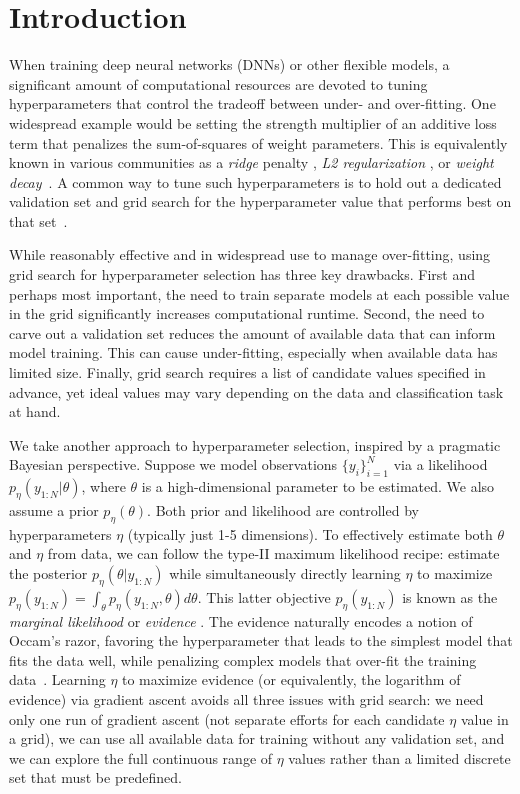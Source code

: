 \section{Introduction}

When training deep neural networks (DNNs) or other flexible models, a significant amount of computational resources are devoted to tuning hyperparameters that control the tradeoff between under- and over-fitting.
One widespread example would be setting the strength multiplier of an additive loss term that penalizes the sum-of-squares of weight parameters.
This is equivalently known in various communities as a \emph{ridge} penalty \citep{hastie2009elements,kobak2020optimal},
\emph{L2 regularization} \citep{murphy2022Regularization}, or \emph{weight decay}~\citep{krogh1991simple,goodfellow2016Regularization}.
A common way to tune such hyperparameters is to hold out a dedicated validation set and grid search for the hyperparameter value that performs best on that set~\citep{raschka2018model,murphy2022Picking}.

While reasonably effective and in widespread use to manage over-fitting, using grid search for hyperparameter selection has three key drawbacks.
First and perhaps most important, the need to train separate models at each possible value in the grid significantly increases computational runtime.
Second, the need to carve out a validation set reduces the amount of available data that can inform model training. This can cause under-fitting, especially when available data has limited size.
Finally, grid search requires a list of candidate values specified in advance, yet ideal values may vary depending on the data and classification task at hand.

We take another approach to hyperparameter selection, inspired by a pragmatic Bayesian perspective. 
Suppose we model observations $\{y_i \}_{i=1}^N$ via a likelihood $p_{\eta}( y_{1:N} | \theta)$, where $\theta$ is a high-dimensional parameter to be estimated. We also assume a prior $p_{\eta}( \theta )$. Both prior and likelihood are controlled by hyperparameters $\eta$ (typically just 1-5 dimensions). To effectively estimate both $\theta$ and $\eta$ from data, we can follow the type-II maximum likelihood recipe: estimate the posterior $p_{\eta}(\theta | y_{1:N})$ while simultaneously directly learning $\eta$ to maximize $p_{\eta}( y_{1:N} ) = \int_{\theta} p_{\eta}( y_{1:N}, \theta) d\theta$. This latter objective $p_{\eta}( y_{1:N} )$ is known as the \emph{marginal likelihood} or \emph{evidence} \cite{lotfi2022bayesian}. The evidence naturally encodes a notion of Occam’s razor, favoring the hyperparameter that leads to the simplest model that fits the data well, while penalizing complex models that over-fit the training data~\citep{jeffreys1939theory,mackay1991bayesian,bishop2006Bayesian}.
Learning $\eta$ to maximize evidence (or equivalently, the logarithm of evidence) via gradient ascent avoids all three issues with grid search: we need only one run of gradient ascent (not separate efforts for each candidate $\eta$ value in a grid), we can use all available data for training without any validation set, and we can explore the full continuous range of $\eta$ values rather than a limited discrete set that must be predefined.

